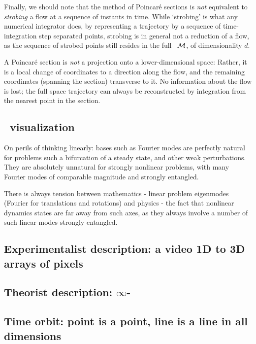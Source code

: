 Finally, we should note that the method of Poincar\'e sections is
\emph{not} equivalent to
\emph{strobing} a flow at a sequence of instants in time. While
`strobing' is what any numerical integrator does, by representing a
trajectory by a sequence of time-integration step separated points,
strobing is in general not a reduction of a flow, as the sequence of
strobed points still resides in the full \statesp\ ${\cal M}$, of
dimensionality $d$.

A Poincar\'e section is {\em not} a projection onto a lower-dimensional
space: Rather, it is a local change of coordinates to a direction along
the flow, and the remaining coordinates (spanning the section) transverse
to it. No information about the flow is lost; the full space trajectory
can always be reconstructed by integration from the nearest point in the
section.

    \ifdraft\color{blue}
\subsection{\Statesp\ visualization}

On perils of thinking linearly: bases such as Fourier modes are
perfectly natural for problems such a bifurcation of a steady state, and
other weak perturbations. They are absolutely unnatural for strongly
nonlinear problems, with many Fourier modes of comparable magnitude and
strongly entangled.

        There is always tension between mathematics - linear problem eigenmodes
        (Fourier for translations and rotations) and physics - the fact that
        nonlinear dynamics states are far away from such axes, as they
        always involve a number of such linear modes strongly entangled.

\subsection{Experimentalist description: a video 1D to 3D arrays of pixels}
\subsection{Theorist description: $\infty$-\dmn\ \statesp}
\subsection{Time orbit: point is a point, line is a line in all dimensions}
\label{sect:TimeOrb}


    \color{black}\fi
